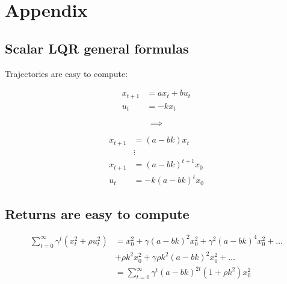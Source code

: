 \documentclass[
  letterpaper,
  DIV=11,
  numbers=noendperiod,
  oneside]{scrartcl}
\begin{document}
\section{Appendix}\label{appendix}

\subsection{Scalar LQR general formulas}\label{gen_scalarLQR}

Trajectories are easy to compute:

\begin{figure}

\begin{minipage}{0.46\linewidth}
\begin{align}
x_{t+1} &= a x_t + b u_t\\
u_t &= -k x_t
\end{align}\end{minipage}%
%
\begin{minipage}{0.09\linewidth}
\[\implies\]\end{minipage}%
%
\begin{minipage}{0.46\linewidth}
\begin{align}
x_{t+1} &= \left( a - bk \right)x_t \\
&\vdots\\
x_{t+1} &= \left( a - bk \right)^{t+1} x_0 \\
u_t &= -k \left( a - bk \right)^t x_0
\end{align}\end{minipage}%

\end{figure}%

\subsection{Returns are easy to
compute}\label{returns-are-easy-to-compute-1}

\begin{align}
\sum_{t=0}^{\infty} \gamma^t \left( x_t^2 + \rho u_t^2 \right) &= x_0^2 + \gamma (a-bk)^2 x_0^2 + \gamma^2 (a-bk)^4 x_0^2 + \ldots\\
&+ \rho k^2 x_0^2 + \gamma \rho k^2 (a-bk)^2 x_0^2 + \ldots \\
&= \sum_{t=0}^{\infty} \gamma^t (a-bk)^{2t} (1 + \rho k^2) x_0^2
\end{align}

\end{document}
